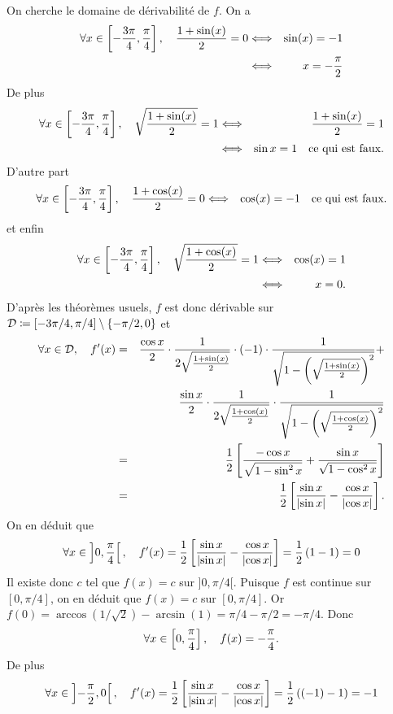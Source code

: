 \documentclass{magnolia}
\begin{document}
\begin{sol}
\begin{questions}
\question On cherche le domaine de dérivabilité de $f$. On a
\begin{eqnarray*}
\forall x\in\left[-\frac{3\pi}{4},\frac{\pi}{4}\right],\quad
\frac{1+\sin(x)}{2}=0
&\Longleftrightarrow& \sin(x)=-1\\
&\Longleftrightarrow& x=-\frac{\pi}{2}
\end{eqnarray*}
De plus
\begin{eqnarray*}
\forall x\in\left[-\frac{3\pi}{4},\frac{\pi}{4}\right],\quad
\sqrt{\frac{1+\sin(x)}{2}}=1
&\Longleftrightarrow& \frac{1+\sin(x)}{2}=1\\
&\Longleftrightarrow& \sin x=1 \quad\text{ce qui est faux.}
\end{eqnarray*}
D'autre part
\begin{eqnarray*}
\forall x\in\left[-\frac{3\pi}{4},\frac{\pi}{4}\right],\quad
\frac{1+\cos(x)}{2}=0
&\Longleftrightarrow& \cos(x)=-1 \quad\text{ce qui est faux.}
\end{eqnarray*}
et enfin
\begin{eqnarray*}
\forall x\in\left[-\frac{3\pi}{4},\frac{\pi}{4}\right],\quad
\sqrt{\frac{1+\cos(x)}{2}}=1
&\Longleftrightarrow& \cos(x)=1\\
&\Longleftrightarrow& x = 0.
\end{eqnarray*}
D'après les théorèmes usuels, $f$ est donc dérivable sur $\mathcal{D}\coloneqq\left[-3\pi/4,\pi/4\right]\setminus\left\{-\pi/2,0\right\}$ et
\begin{eqnarray*}
\forall x\in\mathcal{D},\quad
f'(x)&=&\frac{\cos x}{2}\cdot\frac{1}{2\sqrt{\frac{1+\sin(x)}{2}}}\cdot(-1)\cdot\frac{1}{\sqrt{1-\left(\sqrt{\frac{1+\sin(x)}{2}}\right)^2}}+\\
     & &\frac{\sin x}{2}\cdot\frac{1}{2\sqrt{\frac{1+\cos(x)}{2}}}\cdot\frac{1}{\sqrt{1-\left(\sqrt{\frac{1+\cos(x)}{2}}\right)^2}}\\
&=& \frac{1}{2}\left[\frac{-\cos x}{\sqrt{1-\sin^2 x}}+\frac{\sin x}{\sqrt{1-\cos^2 x}}\right]\\
&=& \frac{1}{2}\left[\frac{\sin x}{\left|\sin x\right|}-\frac{\cos x}{\left|\cos x\right|}\right].
\end{eqnarray*}
\question On en déduit que
\[\forall x\in\left]0,\frac{\pi}{4}\right[,\quad f'(x)=\frac{1}{2}\left[\frac{\sin x}{\left|\sin x\right|}-\frac{\cos x}{\left|\cos x\right|}\right]=\frac{1}{2}\left(1-1\right)=0\]
Il existe donc $c$ tel que $f(x)=c$ sur $]0,\pi/4[$. Puisque $f$ est continue sur $[0,\pi/4]$, on en déduit que $f(x)=c$ sur $[0,\pi/4]$. Or $f(0)=\arccos(1/\sqrt{2})-\arcsin(1)=\pi/4-\pi/2=-\pi/4$. Donc
\[\forall x\in\left[0,\frac{\pi}{4}\right],\quad f(x)=-\frac{\pi}{4}.\]
De plus
\[\forall x\in\left]-\frac{\pi}{2},0\right[,\quad f'(x)=\frac{1}{2}\left[\frac{\sin x}{\left|\sin x\right|}-\frac{\cos x}{\left|\cos x\right|}\right]=\frac{1}{2}\left((-1)-1\right)=-1\]

\end{questions}
\end{sol}
\end{document}
